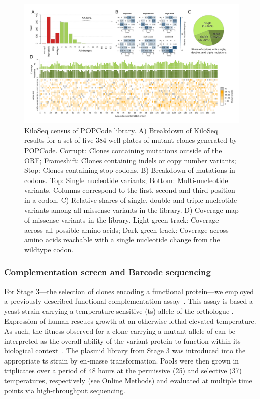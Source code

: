 \begin{landscape}
\begin{figure}[h]
	\centering
	\includegraphics[width=9in]{img/popcode_census.pdf}
	\caption{KiloSeq census of  POPCode library. A) Breakdown of KiloSeq results for a set of five 384 well plates of mutant clones generated by POPCode. Corrupt: Clones containing mutations outside of the ORF; Frameshift: Clones containing indels or copy number variants; Stop: Clones containing stop codons. B) Breakdown of mutations in codons. Top: Single nucleotide variants; Bottom: Multi-nucleotide variants. Columns correspond to the first, second and third position in a codon. C) Relative shares of single, double and triple nucleotide variants among all missense variants in the library. D) Coverage map of missense variants in the library. Light green track: Coverage across all possible amino acids; Dark green track: Coverage across amino acids reachable with a single nucleotide change from the wildtype codon.}
	\label{fig:popcode_census}
\end{figure}
\end{landscape}



\subsubsection{Complementation screen and Barcode sequencing}

For Stage 3---the selection of clones encoding a functional protein---we employed a previously described  functional complementation assay~\cite{lee_complementation_1987,osborn_rescuing_2007}. This assay is based a yeast strain carrying a temperature sensitive (ts) allele of the  orthologue . Expression of human  rescues growth at an otherwise lethal elevated temperature. As such, the fitness observed for a clone carrying a mutant allele of  can be interpreted as the overall ability of the variant protein to function within its biological context~\cite{sun_extended_2016}. 
The plasmid library from Stage 3 was introduced into the appropriate ts strain by en-masse transformation. Pools were then grown in triplicates over a period of 48 hours at the permissive (25\celsius ) and selective (37\celsius ) temperatures, respectively (see Online Methods) and evaluated at multiple time points via high-throughput sequencing.

